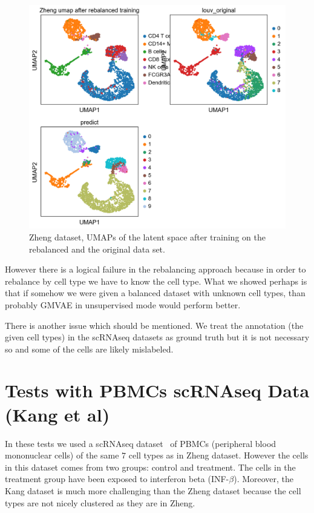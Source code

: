 \documentclass[11pt, a4paper]{report}
\theoremstyle{plain}
\theoremstyle{definition}
\theoremstyle{remark}
\begin{document}
\begin{figure}[h]
\centering
\includegraphics[width=1.1\textwidth]{images/gmmvae_zheng_us_balanced_10c_umap1.png}
\caption{Zheng dataset, UMAPs of the latent space after training 
on the rebalanced and the original data set.
}
\label{fig:zheng_ss_latent_balanced}
\end{figure}

However there is a logical failure in the rebalancing approach because in order
to rebalance by cell type we have to know the cell type.
What we showed perhaps is that if somehow we were given a balanced dataset with
unknown cell types, than probably GMVAE in unsupervised mode would perform better.

There is another issue which should be mentioned. We treat the annotation (the
given cell types) in the scRNAseq datasets as ground truth but it is not
necessary so and some of the cells are likely mislabeled.

\chapter{Tests with PBMCs scRNAseq Data (Kang et al)}
In these tests we used a scRNAseq dataset~\cite{kang2018multiplexed} of PBMCs
(peripheral blood mononuclear cells) of the same $7$ cell types as in Zheng
dataset.
However the cells in this dataset comes from two groups:
control and treatment. The cells in the treatment group have been exposed to
interferon beta (INF-$\beta$).
Moreover,
the Kang dataset is much more challenging than the Zheng dataset because the
cell types are not nicely clustered as they are in Zheng.
\end{document}
